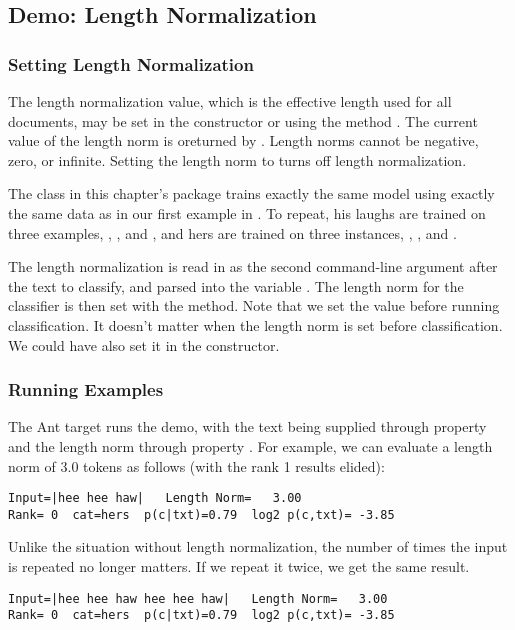 \subsection{Demo: Length Normalization}

\subsubsection{Setting Length Normalization}

The length normalization value, which is the effective length used for
all documents, may be set in the constructor or using the method
.  The current value of the length norm is
oreturned by .  Length norms cannot be negative,
zero, or infinite.  Setting the length norm to  turns
off length normalization.

The class  in this chapter's package trains exactly
the same model using exactly the same data as in our first example in
.  To repeat, his laughs are trained on
three examples, , , and
, and hers are trained on three instances,
, , and
.  

The length normalization is read in as the second command-line
argument after the text to classify, and parsed into the 
variable .  The length norm for the classifier is
then set with the  method.  
%
%
Note that we set the value before running classification.  It
doesn't matter when the length norm is set before classification.
We could have also set it in the constructor.

\subsubsection{Running Examples}

The Ant target  runs the demo, with the text being
supplied through property  and the length norm through
property .  For example, we can evaluate a length
norm of 3.0 tokens as follows (with the rank 1 results elided):
%
\begin{verbatim}
Input=|hee hee haw|   Length Norm=   3.00
Rank= 0  cat=hers  p(c|txt)=0.79  log2 p(c,txt)= -3.85
\end{verbatim}
%
Unlike the situation without length normalization, the number of
times the input is repeated no longer matters.  If we repeat it twice,
we get the same result.
%
\begin{verbatim}
Input=|hee hee haw hee hee haw|   Length Norm=   3.00
Rank= 0  cat=hers  p(c|txt)=0.79  log2 p(c,txt)= -3.85
\end{verbatim}

